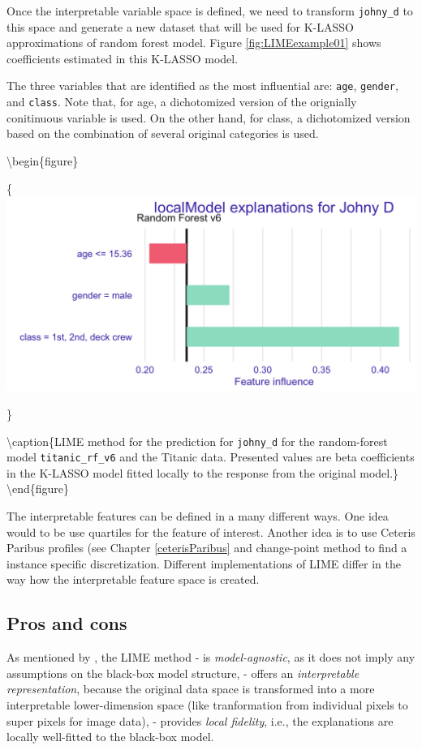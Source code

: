 \documentclass[12pt,]{krantz}
\begin{document}
Once the interpretable variable space is defined, we need to transform \texttt{johny\_d} to this space and generate a new dataset that will be used for K-LASSO approximations of random forest model. Figure \ref{fig:LIMEexample01} shows coefficients estimated in this K-LASSO model.

The three variables that are identified as the most influential are: \texttt{age}, \texttt{gender}, and \texttt{class}. Note that, for age, a dichotomized version of the orignially conitinuous variable is used. On the other hand, for class, a dichotomized version based on the combination of several original categories is used.

\textbackslash{}begin\{figure\}

\{\centering \includegraphics[width=0.6\linewidth]{figure/LIMEexample01}

\}

\textbackslash{}caption\{LIME method for the prediction for \texttt{johny\_d} for the random-forest model \texttt{titanic\_rf\_v6} and the Titanic data. Presented values are beta coefficients in the K-LASSO model fitted locally to the response from the original model.\}\label{fig:LIMEexample01}
\textbackslash{}end\{figure\}

The interpretable features can be defined in a many different ways. One idea would to be use quartiles for the feature of interest. Another idea is to use Ceteris Paribus profiles (see Chapter \ref{ceterisParibus} and change-point method \citep{picard_1985} to find a instance specific discretization.
Different implementations of LIME differ in the way how the interpretable feature space is created.

\hypertarget{LIMEProsCons}{%
\subsection{Pros and cons}\label{LIMEProsCons}}

As mentioned by \citep{lime}, the LIME method
- is \emph{model-agnostic}, as it does not imply any assumptions on the black-box model structure,
- offers an \emph{interpretable representation}, because the original data space is transformed into a more interpretable lower-dimension space (like tranformation from individual pixels to super pixels for image data),
- provides \emph{local fidelity}, i.e., the explanations are locally well-fitted to the black-box model.
\end{document}
